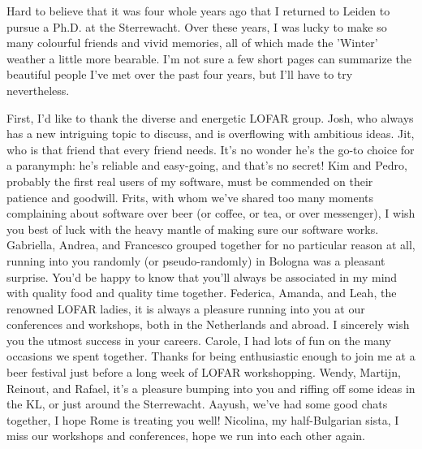 \cleardoublepage
{}
{}
\begin{thesisacknowledgements}
\begin{changemargin}{-1cm}{-1cm}


    \newcommand{\bees}[1]{\texttt{[image: coloremoji.sty/emoji\_images/hires/\#1.pdf]}}
\singlespacing
{\fontsize{11}{12}\selectfont
Hard to believe that it was four whole years ago that I returned to Leiden to pursue a Ph.D. at the Sterrewacht. Over these years, I was lucky to make so many colourful friends and vivid memories, all of which made the 'Winter' weather a little more bearable. I'm not sure a few short pages can summarize the beautiful people I've met over the past four years, but I'll have to try nevertheless.

    First, I'd like to thank the diverse and energetic LOFAR group. Josh, who always has a new intriguing topic to discuss, and is overflowing with ambitious ideas. Jit, who is that friend that every friend needs. It's no wonder he's the go-to choice for a paranymph: he's reliable and easy-going, and that's no secret! Kim and Pedro, probably the first real users of my software, must be commended on their patience and goodwill. Frits, with whom we've shared too many moments complaining about software over beer (or coffee, or tea, or over messenger), I wish you best of luck with the heavy mantle of making sure our software works. Gabriella, Andrea, and Francesco grouped together for no particular reason at all, running into you randomly (or pseudo-randomly) in Bologna was a pleasant surprise. You'd be happy to know that you'll always be associated in my mind with quality food and quality time together. Federica, Amanda, and Leah, the renowned LOFAR ladies, it is always a pleasure running into you at our conferences and workshops, both in the Netherlands and abroad. I sincerely wish you the utmost success in your careers. Carole, I had lots of fun on the many occasions we spent together. Thanks for being enthusiastic enough to join me at a beer festival just before a long week of LOFAR workshopping. Wendy, Martijn, Reinout, and Rafael, it's a pleasure bumping into you and riffing off some ideas in the KL, or just around the Sterrewacht. Aayush, we've had some good chats together, I hope Rome is treating you well! Nicolina, my half-Bulgarian sista, I miss our workshops and conferences, hope we run into each other again. 

}
\end{changemargin}
\end{thesisacknowledgements}
